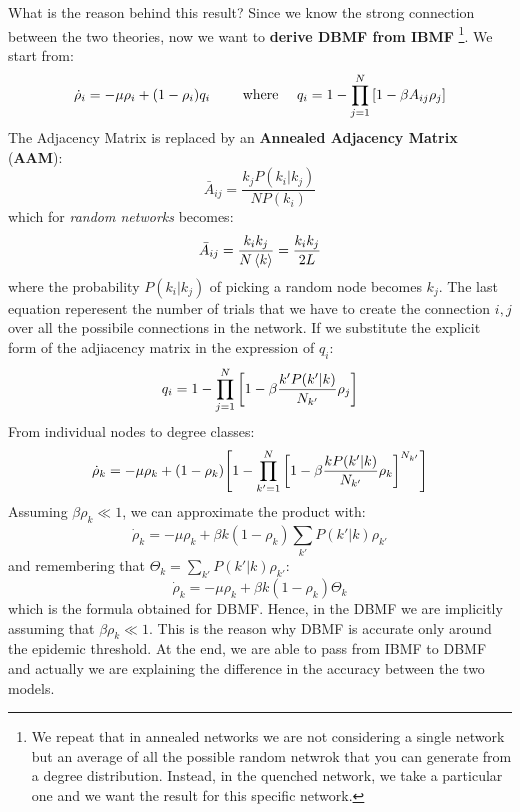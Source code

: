 \documentclass[../main/main.tex]{subfiles}
\begin{document}
What is the reason behind this result? Since we know the strong connection between the two theories, now we want to \textbf{derive DBMF from IBMF}
\footnote{We repeat that in annealed networks we are not considering a single network but an average of all the possible random netwrok that you can generate from a degree distribution. Instead, in the quenched network, we take a particular one and we want the result for this specific network.}. 
We start from:
\begin{equation*}
  \dot{\rho }_i = - \mu \rho _i + (1 - \rho _i) q_i \qquad \text{ where } \quad q_i = 1- \prod_{j=1}^{N} \qty[ 1 - \beta A_{ij} \rho _j]
\end{equation*}
The Adjacency Matrix is replaced by an \textbf{Annealed Adjacency Matrix} (\textbf{AAM}):
\begin{equation}
  \bar{A}_{ij} = \frac{k_j P(k_i|k_j)}{N P (k_i)}
\end{equation}
which for \emph{random networks} becomes:
\begin{equation*}
  \bar{A}_{ij} = \frac{k_i k_j}{N \expval{k} } = \frac{k_i k_j}{2 L}
\end{equation*}
where the probability  \(  P(k_i|k_j) \) of picking a random node becomes \( k_j \). The last equation reperesent the number of trials that we have to create the connection \( i,j \) over all the possibile connections in the network.
If we substitute the explicit form of the adjiacency matrix in the expression of \( q_i \):
\begin{equation*}
  q_i = 1 - \prod_{j=1}^{N} \qty[1 - \beta \frac{k' P(k'|k)}{N_{k'}} \rho _j]
\end{equation*}
From individual nodes to degree classes:
\begin{equation*}
  \dot{\rho }_k = - \mu \rho _k + (1- \rho _k) \qty[ 1 - \prod_{k'=1}^{N} \qty[1 - \beta \frac{k P(k'|k)}{N_{k'}} \rho _k]^{N_{k'}} ]
\end{equation*}
Assuming \( \beta \rho _k \ll 1 \), we can approximate the product with:
\begin{equation*}
  \dot{\rho }_k = - \mu \rho _k + \beta k (1 - \rho _k) \sum_{k'}^{} P(k'|k) \rho _{k'}
\end{equation*}
and remembering that \( \Theta _k = \sum_{k'}^{} P(k'|k)\rho _{k'}   \):
\begin{equation*}
  \dot{\rho }_k = - \mu \rho _k + \beta k (1- \rho _k) \Theta _k
\end{equation*}
which is the formula obtained for DBMF. Hence, in the DBMF we are implicitly assuming that  \( \beta \rho _k \ll 1 \). This is the reason why DBMF is accurate only around the epidemic threshold. At the end, we are able to pass from IBMF to DBMF and actually we are explaining the difference in the accuracy between the two models.
\end{document}
